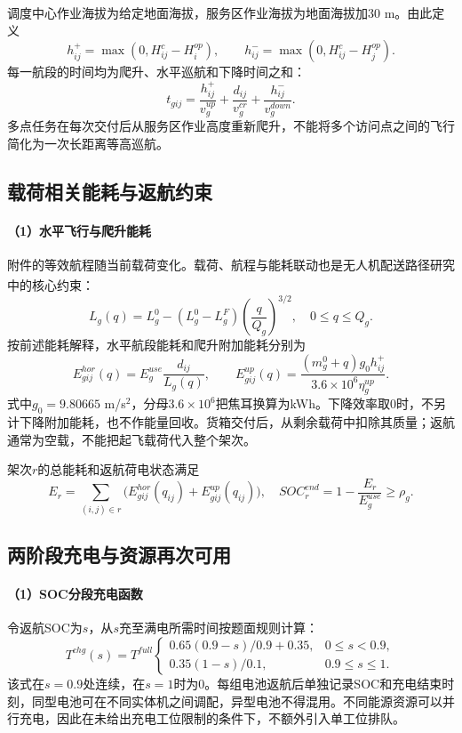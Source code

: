 调度中心作业海拔为给定地面海拔，服务区作业海拔为地面海拔加30 m。由此定义
\begin{equation}
h_{ij}^{+}=\max(0,H_{ij}^{c}-H_i^{op}),\qquad
h_{ij}^{-}=\max(0,H_{ij}^{c}-H_j^{op}).
\end{equation}
每一航段的时间均为爬升、水平巡航和下降时间之和：
\begin{equation}
t_{gij}=\frac{h_{ij}^{+}}{v_g^{up}}+\frac{d_{ij}}{v_g^{cr}}+\frac{h_{ij}^{-}}{v_g^{down}}.\label{eq:leg-time}
\end{equation}
多点任务在每次交付后从服务区作业高度重新爬升，不能将多个访问点之间的飞行简化为一次长距离等高巡航。

\subsection{载荷相关能耗与返航约束}
\paragraph{（1）水平飞行与爬升能耗}
附件的等效航程随当前载荷变化。载荷、航程与能耗联动也是无人机配送路径研究中的核心约束\textsuperscript{\cite{Dorling2017,Zhang2021,Cheng2020}}：
\begin{equation}
L_g(q)=L_g^0-(L_g^0-L_g^F)\left(\frac{q}{Q_g}\right)^{3/2},\quad 0\le q\le Q_g.
\label{eq:range}
\end{equation}
按前述能耗解释，水平航段能耗和爬升附加能耗分别为
\begin{equation}
E_{gij}^{hor}(q)=E_g^{use}\frac{d_{ij}}{L_g(q)},\qquad
E_{gij}^{up}(q)=\frac{(m_g^0+q)g_0h_{ij}^{+}}{3.6\times10^6\eta_g^{up}}.
\label{eq:energy}
\end{equation}
式中$g_0=9.80665$ m/s$^2$，分母$3.6\times10^6$把焦耳换算为kWh。下降效率取0时，不另计下降附加能耗，也不作能量回收。货箱交付后，从剩余载荷中扣除其质量；返航通常为空载，不能把起飞载荷代入整个架次。

架次$r$的总能耗和返航荷电状态满足
\begin{equation}
E_r=\sum_{(i,j)\in r}\bigl(E_{gij}^{hor}(q_{ij})+E_{gij}^{up}(q_{ij})\bigr),
\quad SOC_r^{end}=1-\frac{E_r}{E_g^{use}}\ge\rho_g.
\label{eq:soc}
\end{equation}

\subsection{两阶段充电与资源再次可用}
\paragraph{（1）SOC分段充电函数}
令返航SOC为$s$，从$s$充至满电所需时间按题面规则计算：
\begin{equation}
T^{chg}(s)=T^{full}\begin{cases}
0.65(0.9-s)/0.9+0.35,&0\le s<0.9,\\
0.35(1-s)/0.1,&0.9\le s\le1.
\end{cases}\label{eq:charge}
\end{equation}
该式在$s=0.9$处连续，在$s=1$时为0。每组电池返航后单独记录SOC和充电结束时刻，同型电池可在不同实体机之间调配，异型电池不得混用。不同能源资源可以并行充电，因此在未给出充电工位限制的条件下，不额外引入单工位排队。

